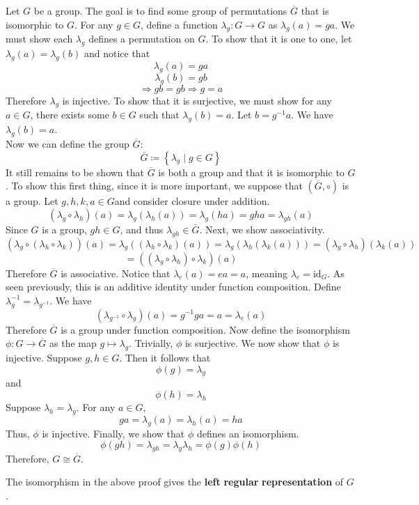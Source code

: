 \documentclass[12pt, letterpaper]{report}
\begin{document}
\begin{longproof}
	Let \(G\) be a group. The goal is to find some group of permutations \(\overline{G} \) that is isomorphic to \(G\). For any \(g\in G\), define a function \(\lambda _g :G\to G\) as \(\lambda _g(a)=ga\). We must show each \(\lambda_g\) defines a permutation on \(G\). To show that it is one to one, let \(\lambda _g(a)=\lambda _g(b)\) and notice that 
	\[
		\lambda _g(a)=ga
	\]
	\[
		\lambda _g(b)=gb
	\]
	\[
		\Longrightarrow gb=gb \Longrightarrow g=a
	\]
	Therefore \(\lambda _g\) is injective. To show that it is surjective, we must show for any \(a\in G\), there exists some \(b\in G\) such that \(\lambda _g(b)=a\). Let \(b=g^{-1} a\). We have \(\lambda _g(b)=a\).\\
	Now we can define the group \(\overline{G} \):
	\[
		\overline{G} \coloneqq \left\{ \lambda _g \mid g\in G \right\}
	\]
	It still remains to be shown that \(\overline{G} \) is both a group and that it is isomorphic to \(G\). To show this first thing, since it is more important, we suppose that \(\left( \overline{G} ,\circ  \right) \) is a group. Let \(g,h,k,a\in G\)and consider closure under addition. 
	\[
		(\lambda _g \circ \lambda _h)(a)=\lambda _g \left( \lambda _h (a) \right) =\lambda _g (ha)=gha = \lambda_{gh}(a) 
	\]
	Since \(G\) is a group, \(gh\in G\), and thus \(\lambda_{gh}\in \overline{G}  \). Next, we show associativity. 
	\[
		\left( \lambda _g \circ \left( \lambda _h \circ \lambda_k \right)  \right)(a)= \lambda_g \left(\left(\lambda _h \circ \lambda_k\right)(a)\right)=\lambda _g \left( \lambda _h \left( \lambda _k (a) \right) \right) = \left( \lambda _g \circ \lambda _h \right) \left( \lambda _k(a) \right)
	\]
	\[
		=\left( \left( \lambda _g \circ \lambda _h \right)\circ \lambda _k  \right) (a)
	\]
	Therefore \(\overline{G} \) is associative. Notice that \(\lambda_e (a)=ea=a\), meaning \(\lambda_e = \text{id}_G \). As seen previously, this is an additive identity under function composition. Define \(\lambda _g ^{-1} =\lambda _{g^{-1} }\). We have 
	\[
		\left( \lambda _{g^{-1} }\circ \lambda _g \right)(a) = g^{-1} g a = a = \lambda _e (a)
	\]
	Therefore \(\overline{G} \) is a group under function composition. Now define the isomorphism \(\phi :G\to \overline{G} \) as the map \(g\mapsto \lambda _g\). Trivially, \(\phi \) is surjective. We now show that \(\phi \) is injective. Suppose \(g,h\in G\). Then it follows that 
	\[
		\phi (g)=\lambda _g
	\]
	and
	\[
		\phi (h)=\lambda _h
	\]
	Suppose \(\lambda _h = \lambda _g\). For any \(a\in G\),
	\[
		ga = \lambda _g(a)=\lambda _h(a)=ha
	\]
	Thus, \(\phi \) is injective. Finally, we show that \(\phi \) defines an isomorphism.
	\[
		\phi (gh)=\lambda_{gh}=\lambda_g \lambda _h = \phi (g)\phi (h) 
	\]
	Therefore, \(G\cong \overline{G} \).
\end{longproof}
\begin{remark}
	The isomorphism in the above proof gives the \textbf{left} \textbf{regular} \textbf{representation} of \(G\).
\end{remark}
\end{document}
